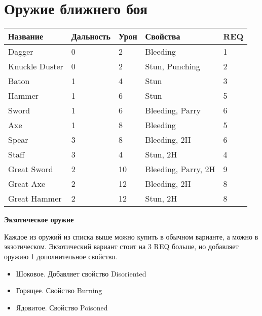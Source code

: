     \section*{Оружие ближнего боя}
\begin{table}[H]
\centering
\begin{tabular}{|l|l|l|l|l|}
\hline
Название       & Дальность & Урон & Свойства             & REQ \\ \hline
Dagger         & 0         & 2    & Bleeding             & 1   \\ \hline
Knuckle Duster & 0         & 2    & Stun, Punching       & 2   \\ \hline
Baton          & 1         & 4    & Stun                 & 3   \\ \hline
Hammer         & 1         & 6    & Stun                 & 5   \\ \hline
Sword          & 1         & 6    & Bleeding, Parry      & 6   \\ \hline
Axe            & 1         & 8    & Bleeding             & 5   \\ \hline
Spear          & 3         & 8    & Bleeding, 2H         & 6   \\ \hline
Staff          & 3         & 4    & Stun, 2H             & 4   \\ \hline
Great Sword    & 2         & 10   & Bleeding, Parry, 2H & 9   \\ \hline
Great Axe      & 2         & 12   & Bleeding, 2H         & 8   \\ \hline
Great Hammer    & 2         & 12   & Stun, 2H             & 8   \\ \hline
\end{tabular}
\end{table}

\textbf{Экзотическое оружие}

Каждое из оружий из списка выше можно купить в обычном варианте, а можно в экзотическом. Экзотический вариант стоит на 3 REQ больше, но
добавляет оружию 1 дополнительное свойство.

\begin{itemize}
    \item Шоковое. Добавляет свойство Disoriented
    \item Горящее. Свойство Burning
    \item Ядовитое. Свойство Poisoned
\end{itemize}

